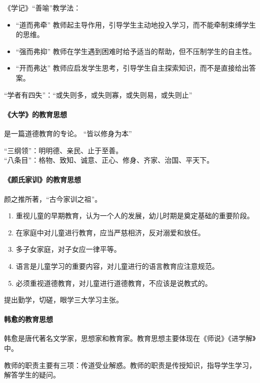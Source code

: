 \documentclass[b5paper,11pt]{article}
\begin{document}
《学记》\textcolor{ctp-red}{“善喻”}教学法：
\begin{itemize}
  \item \textcolor{ctp-red}{“道而弗牵”} 教师起主导作用，引导学生主动地投入学习，而不能牵制束缚学生的思维。
  \item \textcolor{ctp-red}{“强而弗抑”} 教师在学生遇到困难时给予适当的帮助，但不压制学生的自主性。
  \item \textcolor{ctp-red}{“开而弗达”} 教师应启发学生思考，引导学生自主探索知识，而不是直接给出答案。
\end{itemize}

\textcolor{ctp-red}{“学者有四失”}：“或失则多，或失则寡，或失则易，或失则止”

\paragraph{《大学》的教育思想} 是一篇\textcolor{ctp-red}{道德教育的专论。}
\textcolor{ctp-peach}{“皆以修身为本”}

\noindent
\textcolor{ctp-red}{“三纲领”}：明明德、亲民、止于至善。\\
\textcolor{ctp-red}{“八条目”}：格物、致知、诚意、正心、修身、齐家、治国、平天下。

\paragraph{《颜氏家训》的教育思想} 颜之推所著，“古今家训之祖”。
\begin{enumerate}
  \item 重视儿童的早期教育，认为一个人的发展，幼儿时期是奠定基础的重要阶段。
  \item 在家庭中对儿童进行教育，应当严慈相济，反对溺爱和放任。
  \item 多子女家庭，对子女应一律平等。
  \item 语言是儿童学习的重要内容，对儿童进行的语言教育应注意规范。
  \item 必须重视道德教育，对儿童进行道德教育，不应该是说教式的。
\end{enumerate}

\textcolor{ctp-red}{提出勤学，切磋，眼学}三大学习主张。

\paragraph{韩愈的教育思想} 韩愈是唐代著名文学家，思想家和教育家。教育思想主要体现在《师说》《进学解》中。

教师的职责主要有三项：传道受业解惑。教师的职责是传授知识，指导学生学习，解答学生的疑问。
\end{document}
